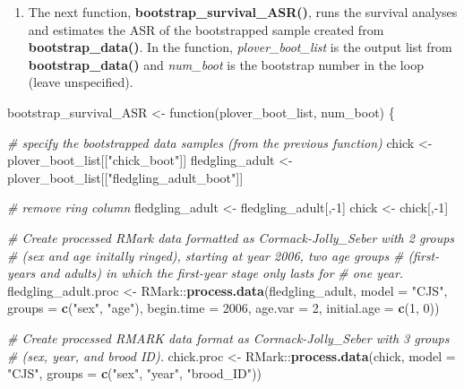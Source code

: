 \documentclass[]{article}
\newenvironment{Shaded}{\begin{snugshade}}{\end{snugshade}}
\newcommand{\KeywordTok}[1]{\textcolor[rgb]{0.13,0.29,0.53}{\textbf{{#1}}}}
\newcommand{\DataTypeTok}[1]{\textcolor[rgb]{0.13,0.29,0.53}{{#1}}}
\newcommand{\DecValTok}[1]{\textcolor[rgb]{0.00,0.00,0.81}{{#1}}}
\newcommand{\StringTok}[1]{\textcolor[rgb]{0.31,0.60,0.02}{{#1}}}
\newcommand{\CommentTok}[1]{\textcolor[rgb]{0.56,0.35,0.01}{\textit{{#1}}}}
\newcommand{\NormalTok}[1]{{#1}}
\providecommand{\tightlist}{%
  \setlength{\itemsep}{0pt}\setlength{\parskip}{0pt}}
\begin{document}
\begin{enumerate}
\def\labelenumi{\Alph{enumi})}
\setcounter{enumi}{1}
\tightlist
\item
  The next function, \textbf{bootstrap\_survival\_ASR()}, runs the
  survival analyses and estimates the ASR of the bootstrapped sample
  created from \textbf{bootstrap\_data()}. In the function,
  \emph{plover\_boot\_list} is the output list from
  \textbf{bootstrap\_data()} and \emph{num\_boot} is the bootstrap
  number in the loop (leave unspecified).
\end{enumerate}

\begin{Shaded}
\begin{Highlighting}[]
\NormalTok{bootstrap_survival_ASR <-}\StringTok{ }\NormalTok{function(plover_boot_list, num_boot) \{}
  
  \CommentTok{# specify the bootstrapped data samples (from the previous function)}
  \NormalTok{chick <-}\StringTok{ }\NormalTok{plover_boot_list[[}\StringTok{"chick_boot"}\NormalTok{]]}
  \NormalTok{fledgling_adult <-}\StringTok{ }\NormalTok{plover_boot_list[[}\StringTok{"fledgling_adult_boot"}\NormalTok{]]}
  
  \CommentTok{# remove ring column}
  \NormalTok{fledgling_adult <-}\StringTok{ }\NormalTok{fledgling_adult[,-}\DecValTok{1}\NormalTok{]}
  \NormalTok{chick <-}\StringTok{ }\NormalTok{chick[,-}\DecValTok{1}\NormalTok{]}
  
  \CommentTok{# Create processed RMark data formatted as Cormack-Jolly_Seber with 2 groups }
  \CommentTok{# (sex and age initally ringed), starting at year 2006, two age groups}
  \CommentTok{# (first-years and adults) in which the first-year stage only lasts for }
  \CommentTok{# one year.}
  \NormalTok{fledgling_adult.proc <-}\StringTok{ }\NormalTok{RMark::}\KeywordTok{process.data}\NormalTok{(fledgling_adult, }\DataTypeTok{model =} \StringTok{"CJS"}\NormalTok{,}
                                              \DataTypeTok{groups =} \KeywordTok{c}\NormalTok{(}\StringTok{"sex"}\NormalTok{, }\StringTok{"age"}\NormalTok{),}
                                              \DataTypeTok{begin.time =} \DecValTok{2006}\NormalTok{, }\DataTypeTok{age.var =} \DecValTok{2}\NormalTok{, }
                                              \DataTypeTok{initial.age =} \KeywordTok{c}\NormalTok{(}\DecValTok{1}\NormalTok{, }\DecValTok{0}\NormalTok{))}
  
  \CommentTok{# Create processed RMARK data format as Cormack-Jolly_Seber with 3 groups }
  \CommentTok{# (sex, year, and brood ID).}
  \NormalTok{chick.proc <-}\StringTok{  }\NormalTok{RMark::}\KeywordTok{process.data}\NormalTok{(chick, }\DataTypeTok{model =} \StringTok{"CJS"}\NormalTok{,}
                                     \DataTypeTok{groups =} \KeywordTok{c}\NormalTok{(}\StringTok{"sex"}\NormalTok{, }\StringTok{"year"}\NormalTok{, }\StringTok{"brood_ID"}\NormalTok{))}
  

\end{Highlighting}
\end{Shaded}
\end{document}
